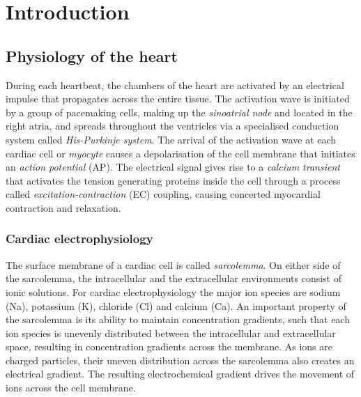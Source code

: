 \chapter{Introduction}\label{cha:chapter1}
%
%
%
\section{Physiology of the heart}
During each heartbeat, the chambers of the heart are activated by an electrical impulse that propagates across the entire tissue. The activation wave is initiated by a group of pacemaking cells, making up the \textit{sinoatrial node} and located in the right atria, and spreads throughout the ventricles via a specialised conduction system called \textit{His-Purkinje system}. The arrival of the activation wave at each cardiac cell or \textit{myocyte} causes a depolarisation of the cell membrane that initiates an \textit{action potential} (\acs{AP}). The electrical signal gives rise to a \textit{calcium transient} that activates the tension generating proteins inside the cell through a process called \textit{excitation-contraction} (\acs{EC}) coupling, causing concerted myocardial contraction and relaxation. 


%
%
%
\subsection{Cardiac electrophysiology}\label{sec:cardiacelecphys}
The surface membrane of a cardiac cell is called \textit{sarcolemma}. On either side of the sarcolemma, the intracellular and the extracellular environments consist of ionic solutions. For cardiac electrophysiology the major ion species are sodium (\acs{Na}), potassium (\acs{K}), chloride (\acs{Cl}) and calcium (\acs{Ca}). An important property of the sarcolemma is its ability to maintain concentration gradients, such that each ion species is unevenly distributed between the intracellular and extracellular space, resulting in concentration gradients across the membrane. As ions are charged particles, their uneven distribution across the sarcolemma also creates an electrical gradient. The resulting electrochemical gradient drives the movement of ions across the cell membrane.


